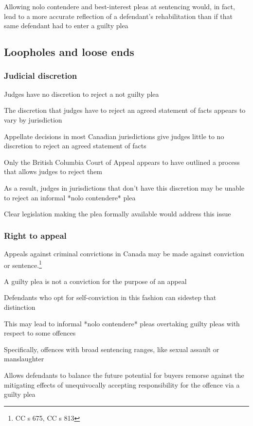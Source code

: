 Allowing nolo contendere and best-interest pleas at sentencing would, in fact, lead to a more accurate reflection of a defendant's rehabilitation than if that same defendant had to enter a guilty plea

\subsection{Loopholes and loose ends}

\subsubsection{Judicial discretion}

Judges have no discretion to reject a not guilty plea

The discretion that judges have to reject an agreed statement of facts appears to vary by jurisdiction

Appellate decisions in most Canadian jurisdictions give judges little to no discretion to reject an agreed statement of facts

Only the British Columbia Court of Appeal appears to have outlined a process that allows judges to reject them

As a result, judges in jurisdictions that don't have this discretion may be unable to reject an informal *nolo contendere* plea

Clear legislation making the plea formally available would address this issue

\subsubsection{Right to appeal}

Appeals against criminal convictions in Canada may be made against conviction or sentence.\footnote{CC s 675, CC s 813}

A guilty plea is not a conviction for the purpose of an appeal

Defendants who opt for self-conviction in this fashion can sidestep that distinction

This may lead to informal *nolo contendere* pleas overtaking guilty pleas with respect to some offences

Specifically, offences with broad sentencing ranges, like sexual assault or manslaughter

Allows defendants to balance the future potential for buyers remorse against the mitigating effects of unequivocally accepting responsibility for the offence via a guilty plea

